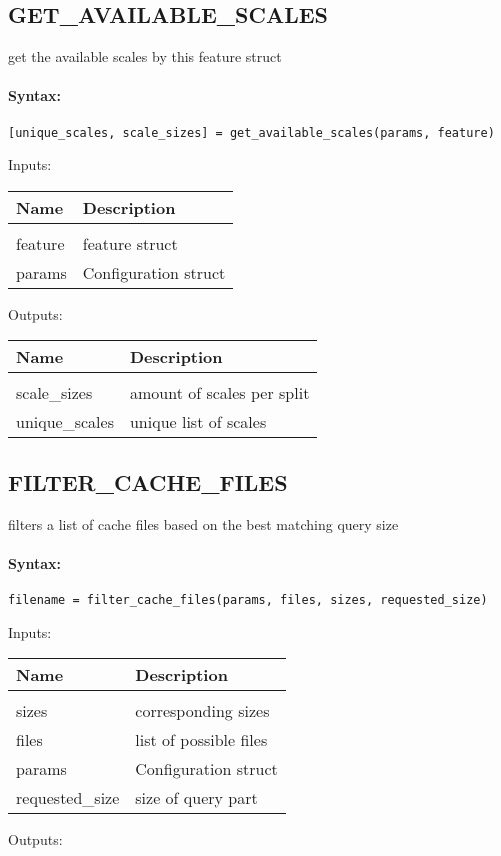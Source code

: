 \subsection{GET\_AVAILABLE\_SCALES}

get the available scales by this feature struct

\paragraph{Syntax:} \verb|[unique_scales, scale_sizes] = get_available_scales(params, feature)|

Inputs:

\begin{tabular}{|l|p{5cm}|}
\hline
\textbf{Name} & \textbf{Description} \\
\hline \hline \\
feature & feature struct  \\ \hline
params & Configuration struct  \\ \hline
\end{tabular}
Outputs:

\begin{tabular}{|l|p{5cm}|}
\hline
\textbf{Name} & \textbf{Description} \\
\hline \hline \\
scale\_sizes & amount of scales per split  \\ \hline
unique\_scales & unique list of scales  \\ \hline
\end{tabular}

\subsection{FILTER\_CACHE\_FILES}

filters a list of cache files based on the best matching query size

\paragraph{Syntax:} \verb|filename = filter_cache_files(params, files, sizes, requested_size)|

Inputs:

\begin{tabular}{|l|p{5cm}|}
\hline
\textbf{Name} & \textbf{Description} \\
\hline \hline \\
sizes & corresponding sizes  \\ \hline
files & list of possible files  \\ \hline
params & Configuration struct  \\ \hline
requested\_size & size of query part  \\ \hline
\end{tabular}
Outputs:


